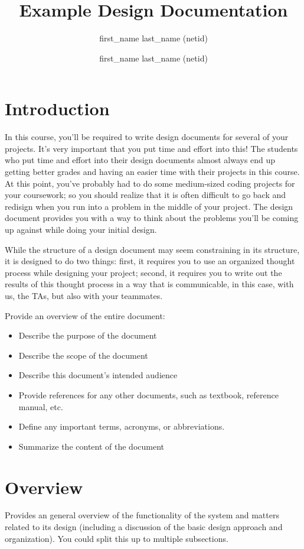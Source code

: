 \documentclass[10pt]{article}
\title{Example Design Documentation}
\author{first\_name last\_name (netid) \and first\_name last\_name (netid)}
\begin{document}
\maketitle

\section{Introduction}
In this course, you'll be required to write design documents for several of your projects.
It's very important that you put time and effort into this!
The students who put time and effort into their design documents almost always end up getting better grades and having an easier time with their projects in this course.
At this point, you've probably had to do some medium-sized coding projects for your coursework;
so you should realize that it is often difficult to go back and redisign when you run into a problem in the middle of your project.
The design document provides you with a way to think about the problems you'll be coming up against while doing your initial design.

While the structure of a design document may seem constraining in its structure, it is designed to do two things:
first, it requires you to use an organized thought process while designing your project; 
second, it requires you to write out the results of this thought process in a way that is communicable, in this case, with us, the TAs, but also with your teammates.

Provide an overview of the entire document:
\begin{itemize}
\item Describe the purpose of the document
\item Describe the scope of the document
\item Describe this document's intended audience
\item Provide references for any other documents, such as textbook, reference manual, etc.
\item Define any important terms, acronyms, or abbreviations.
\item Summarize the content of the document
\end{itemize}

\section{Overview}
Provides an general overview of the functionality of the system and matters related to its design (including
a discussion of the basic design approach and organization). You could split this up to multiple subsections.
\end{document}
